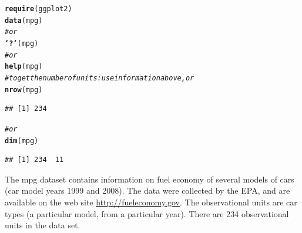 \documentclass[twoside]{book}\usepackage[]{graphicx}\usepackage[]{xcolor}
\makeatletter
\newcommand{\hlcom}[1]{\textcolor[rgb]{0.678,0.584,0.686}{\textit{#1}}}%
\newcommand{\hlstd}[1]{\textcolor[rgb]{0.345,0.345,0.345}{#1}}%
\newcommand{\hlkwd}[1]{\textcolor[rgb]{0.737,0.353,0.396}{\textbf{#1}}}%
\newenvironment{kframe}{%
 \def\at@end@of@kframe{}%
 \ifinner\ifhmode%
  \def\at@end@of@kframe{\end{minipage}}%
  \begin{minipage}{\columnwidth}%
 \fi\fi%
 \def\FrameCommand##1{\hskip\@totalleftmargin \hskip-\fboxsep
 \colorbox{shadecolor}{##1}\hskip-\fboxsep
     \hskip-\linewidth \hskip-\@totalleftmargin \hskip\columnwidth}%
 \MakeFramed {\advance\hsize-\width
   \@totalleftmargin\z@ \linewidth\hsize
   \@setminipage}}%
 {\par\unskip\endMakeFramed%
 \at@end@of@kframe}
\newenvironment{knitrout}{}{} %
\makeatother
\begin{document}
\begin{solution}
\begin{knitrout}
\color{fgcolor}\begin{kframe}
\begin{alltt}
\hlkwd{require}\hlstd{(ggplot2)}
\hlkwd{data}\hlstd{(mpg)}
\hlcom{# or}
\hlkwd{`?`}\hlstd{(mpg)}
\hlcom{# or}
\hlkwd{help}\hlstd{(mpg)}
\hlcom{# to get the number of units: use information above, or}
\hlkwd{nrow}\hlstd{(mpg)}
\end{alltt}
\begin{verbatim}
## [1] 234
\end{verbatim}
\begin{alltt}
\hlcom{# or}
\hlkwd{dim}\hlstd{(mpg)}
\end{alltt}
\begin{verbatim}
## [1] 234  11
\end{verbatim}
\end{kframe}
\end{knitrout}
The mpg dataset contains information on fuel economy of several models of cars (car model years 1999 and 2008). The data were collected by the EPA, and are available on the web site \url{http://fueleconomy.gov}.  The observational units are car types (a particular model, from a particular year).  There are 234 observational units in the data set.
\end{solution}
\end{document}
